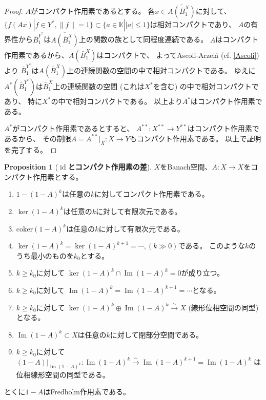 \documentclass[uplatex]{jsarticle}
\theoremstyle{definition}
\newtheorem{prop}[prop]{Proposition}
\DeclareMathOperator{\id}{\mathrm{id}}
\DeclareMathOperator{\im}{\mathrm{Im}}
\newcommand{\coker}{\mathrm{coker}}
\newcommand{\K}{\mathbb{K}}
\begin{document}
\begin{proof}
  \(A\)がコンパクト作用素であるとする。
  各\(x\in \overline{A(\bar{B}_1^X)}\)に対して、
  \(\{f(Ax) | f\in Y^*, \|f\| = 1\}\subset \{a\in \K| |a|\leq 1\}\)は相対コンパクトであり、
  \(A\)の有界性から\(\bar{B}_1^{Y^*}\)は\(\overline{A(\bar{B}_1^X)}\)上の関数の族として同程度連続である。
  \(A\)はコンパクト作用素であるから、\(\overline{A(\bar{B}_1^X)}\)はコンパクトで、
  よってAscoli-Arzel\'{a} (cf. \autoref{Ascoli}) より
  \(\bar{B}_1^{Y^*}\)は\(A(\bar{B}_1^X)\)上の連続関数の空間の中で相対コンパクトである。
  ゆえに\(A^*(\bar{B}_1^{Y^*})\)は\(\bar{B}_1^X\)上の連続関数の空間
  (これは\(X^*\)を含む) の中で相対コンパクトであり、
  特に\(X^*\)の中で相対コンパクトである。
  以上より\(A^*\)はコンパクト作用素である。

  \(A^*\)がコンパクト作用素であるとすると、
  \(A^{**}:X^{**}\to Y^{**}\)はコンパクト作用素であるから、
  その制限\(A = A^{**}|_X:X \to Y\)もコンパクト作用素である。
  以上で証明を完了する。
\end{proof}





\begin{prop}[\textbf{\(\id\)とコンパクト作用素の差}]
  \label{id - cpt is Fredholm}
  \(X\)をBanach空間、\(A:X\to X\)をコンパクト作用素とする。
  \begin{enumerate}
    \item \label{power cpt}
    \(1-(1-A)^k\)は任意の\(k\)に対してコンパクト作用素である。
    \item \label{ker fin}
    \(\ker(1-A)^k\)は任意の\(k\)に対して有限次元である。
    \item \label{coker fin}
    \(\coker(1-A)^k\)は任意の\(k\)に対して有限次元である。
    \item \label{ker stable}
    \(\ker(1-A)^k = \ker(1-A)^{k+1} = \cdots, (k\gg 0)\)である。
    このような\(k\)のうち最小のものを\(k_0\)とする。
    \item \label{ker cap im}
    \(k \geq k_0\)に対して
    \(\ker(1-A)^k\cap \im(1-A)^k = 0\)が成り立つ。
    \item \label{im stable}
    \(k \geq k_0\)に対して
    \(\im(1-A)^k = \im(1-A)^{k+1} = \cdots\)となる。
    \item \label{X decomp}
    \(k \geq k_0\)に対して
    \(\ker(1-A)^k \oplus \im(1-A)^k\xrightarrow{\sim} X\)
    (線形位相空間の同型) となる。
    \item \label{im cl}
    \(\im(1-A)^k\subset X\)は任意の\(k\)に対して閉部分空間である。
    \item \label{rest isom}
    \(k \geq k_0\)に対して
    \((1-A)|_{\im(1-A)^k}: \im(1-A)^k \xrightarrow{\sim} \im(1-A)^{k+1} = \im(1-A)^k\)
    は位相線形空間の同型である。
  \end{enumerate}
  とくに\(1-A\)はFredholm作用素である。
\end{prop}
\end{document}
